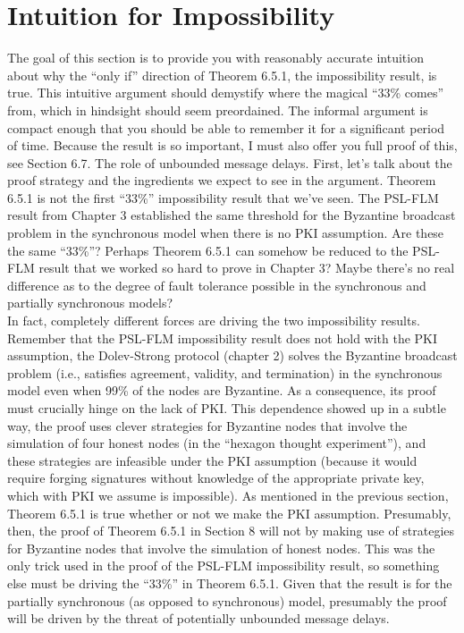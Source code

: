 \section{Intuition for Impossibility}
The goal of this section is to provide you with reasonably accurate intuition about why
the “only if” direction of Theorem 6.5.1, the impossibility result, is true. This intuitive
argument should demystify where the magical “33\% comes” from, which in hindsight should
seem preordained. The informal argument is compact enough that you should be able to
remember it for a significant period of time. Because the result is so important, I must also offer you full proof of this, see Section 6.7.
The role of unbounded message delays. First, let’s talk about the proof strategy and the
ingredients we expect to see in the argument. Theorem 6.5.1 is not the first “33\%” impossibility
result that we've seen. The PSL-FLM result from Chapter 3 established the same
threshold for the Byzantine broadcast problem in the synchronous model when there is no
PKI assumption. Are these the same “33\%”? Perhaps Theorem 6.5.1 can somehow be reduced
to the PSL-FLM result that we worked so hard to prove in Chapter 3? Maybe there’s no
real difference as to the degree of fault tolerance possible in the synchronous and partially
synchronous models?\\
In fact, completely different forces are driving the two impossibility results. Remember
that the PSL-FLM impossibility result does not hold with the PKI assumption, 
the Dolev-Strong protocol (chapter 2) solves the Byzantine broadcast problem (i.e., satisfies
agreement, validity, and termination) in the synchronous model even when 99\% of the nodes
are Byzantine. As a consequence, its proof must crucially hinge on the lack of PKI. This dependence showed up in a subtle way, the proof uses clever strategies for Byzantine nodes
that involve the simulation of four honest nodes (in the “hexagon thought experiment”), and these strategies are infeasible under the PKI assumption (because it
would require forging signatures without knowledge of the appropriate private key, which
with PKI we assume is impossible).
As mentioned in the previous section, Theorem 6.5.1 is true whether or not we make the
PKI assumption. Presumably, then, the proof of Theorem 6.5.1 in Section 8 will not by making
use of strategies for Byzantine nodes that involve the simulation of honest nodes. This was
the only trick used in the proof of the PSL-FLM impossibility result, so something else must
be driving the “33\%” in Theorem 6.5.1. Given that the result is for the partially synchronous
(as opposed to synchronous) model, presumably the proof will be driven by the threat of
potentially unbounded message delays.\\

